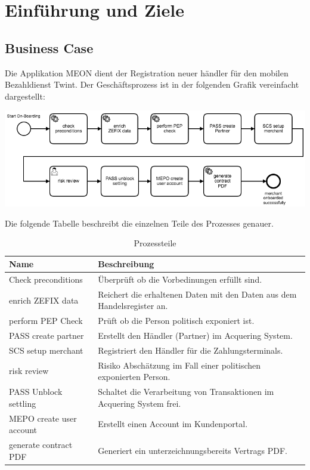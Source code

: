 \graphicspath{{./images/}}


\chapter{Einführung und Ziele}

\section{Business Case}

Die Applikation MEON dient der Registration neuer händler für den mobilen Bezahldienst Twint.  Der Geschäftsprozess ist in der folgenden Grafik vereinfacht dargestellt:

\begin{center}
	\includegraphics[scale=0.55]{meon-workflow.png}
\end{center}

Die folgende Tabelle beschreibt die einzelnen Teile des Prozesses genauer.

\begin{table}[H]
	\centering
	\caption{Prozessteile}
	\begin{tabular}{ | p{4cm} | p{12cm} | }
		\toprule
		{\textbf{Name}} & {\textbf{Beschreibung}} \\
		\midrule
		Check preconditions & Überprüft ob die Vorbedinungen erfüllt sind. \\ \hline
		enrich ZEFIX data & Reichert die erhaltenen Daten mit den Daten aus dem Handelsregister an. \\ \hline
		perform PEP Check & Prüft ob die Person politisch exponiert ist. \\ \hline
		PASS create partner & Erstellt den Händler (Partner) im Acquering System.\\ \hline
		SCS setup merchant & Registriert den Händler für die Zahlungsterminals. \\ \hline
		risk review  & Risiko Abschätzung im Fall einer politischen exponierten Person. \\ \hline
	    PASS Unblock settling & Schaltet die Verarbeitung von Transaktionen im Acquering System frei. \\ \hline
	    MEPO create user account&  Erstellt einen Account im Kundenportal. \\ \hline
	    generate contract PDF & Generiert ein unterzeichnungsbereits Vertrags PDF.  \\
		\bottomrule
	\end{tabular}
\end{table}

